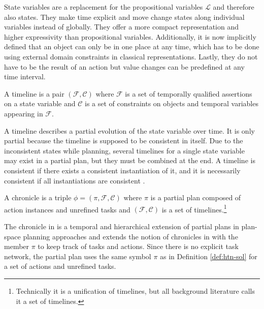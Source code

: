 State variables are a replacement for the propositional variables $\mathcal{L}$ and therefore also states.
They make time explicit and move change states along individual variables instead of globally.
They offer a more compact representation and higher expressivity than propositional variables.
Additionally, it is now implicitly defined that an object can only be in one place at any time, which has to be done using external domain constraints in classical representations. 
Lastly, they do not have to be the result of an action but value changes can be predefined at any time interval.

\begin{definition}[Timeline]
  A timeline is a pair $(\mathcal{F},\mathcal{C})$ where $\mathcal{F}$ is a set of temporally qualified assertions on a state variable and $\mathcal{C}$ is a set of constraints on objects and temporal variables appearing in $\mathcal{F}$.
\end{definition}
A timeline describes a partial evolution of the state variable over time.
It is only partial because the timeline is supposed to be consistent in itself.
Due to the inconsistent states while planning, several timelines for a single state variable may exist in a partial plan, but they must be combined at the end.
A timeline is consistent if there exists a consistent instantiation of it, and it is necessarily consistent if all instantiations are consistent \cite{bit-monnotTemporalHierarchicalModels2016a}.


\begin{definition}[Chronicle]
  A chronicle is a triple $\phi = (\pi,\mathcal{F},\mathcal{C})$ where $\pi$ is a partial plan composed of action instances and unrefined tasks and $(\mathcal{F},\mathcal{C})$ is a set of timelines.\footnote{Technically it is a unification of timelines, but all background literature calls it a set of timelines.}
\end{definition}
The chronicle in \cite{bit-monnotFAPEConstraintbasedPlanner2020} is a temporal and hierarchical extension of partial plans in plan-space planning approaches \citep[chap.~5]{ghallabAutomatedPlanningTheory2004} and extends the notion of chronicles in \cite[sec.~4.2.4]{ghallabAutomatedPlanningActing2016} with the member $\pi$ to keep track of tasks and actions.
Since there is no explicit task network, the partial plan uses the same symbol $\pi$ as in Definition \ref{def:htn-sol} for a set of actions and unrefined tasks.



